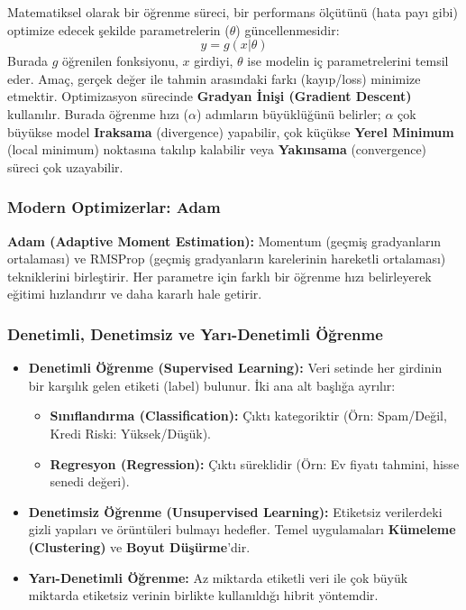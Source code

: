 \documentclass[12pt,a4paper]{article}
\begin{document}
Matematiksel olarak bir öğrenme süreci, bir performans ölçütünü (hata payı gibi) optimize edecek şekilde parametrelerin ($\theta$) güncellenmesidir:
\begin{equation}
    y = g(x | \theta)
\end{equation}
Burada $g$ öğrenilen fonksiyonu, $x$ girdiyi, $\theta$ ise modelin iç parametrelerini temsil eder. Amaç, gerçek değer ile tahmin arasındaki farkı (kayıp/loss) minimize etmektir. Optimizasyon sürecinde \textbf{Gradyan İnişi (Gradient Descent)} kullanılır. Burada öğrenme hızı ($\alpha$) adımların büyüklüğünü belirler; $\alpha$ çok büyükse model \textbf{Iraksama} (divergence) yapabilir, çok küçükse \textbf{Yerel Minimum} (local minimum) noktasına takılıp kalabilir veya \textbf{Yakınsama} (convergence) süreci çok uzayabilir.

\subsubsection{Modern Optimizerlar: Adam}
\textbf{Adam (Adaptive Moment Estimation):} Momentum (geçmiş gradyanların ortalaması) ve RMSProp (geçmiş gradyanların karelerinin hareketli ortalaması) tekniklerini birleştirir. Her parametre için farklı bir öğrenme hızı belirleyerek eğitimi hızlandırır ve daha kararlı hale getirir.

\subsubsection{Denetimli, Denetimsiz ve Yarı-Denetimli Öğrenme}
\begin{itemize}
    \item \textbf{Denetimli Öğrenme (Supervised Learning):} Veri setinde her girdinin bir karşılık gelen etiketi (label) bulunur. İki ana alt başlığa ayrılır:
    \begin{itemize}
        \item \textbf{Sınıflandırma (Classification):} Çıktı kategoriktir (Örn: Spam/Değil, Kredi Riski: Yüksek/Düşük).
        \item \textbf{Regresyon (Regression):} Çıktı süreklidir (Örn: Ev fiyatı tahmini, hisse senedi değeri).
    \end{itemize}
    \item \textbf{Denetimsiz Öğrenme (Unsupervised Learning):} Etiketsiz verilerdeki gizli yapıları ve örüntüleri bulmayı hedefler. Temel uygulamaları \textbf{Kümeleme (Clustering)} ve \textbf{Boyut Düşürme}'dir.
    \item \textbf{Yarı-Denetimli Öğrenme:} Az miktarda etiketli veri ile çok büyük miktarda etiketsiz verinin birlikte kullanıldığı hibrit yöntemdir.
\end{itemize}
\end{document}
